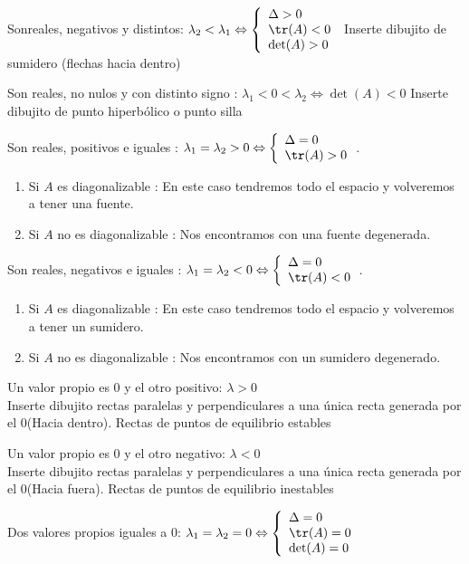 \begin{nlist}
  
\item Sonreales, negativos y distintos: $\lambda_2 < \lambda_1 \Leftrightarrow \left\{ \begin{array}{ll}\Delta > 0 \\ \tr(A) < 0 \\ \det(A)>0\end{array}\right.$
Inserte dibujito de sumidero (flechas hacia dentro)
\item Son reales, no nulos y con distinto signo : $\lambda_1 < 0 < \lambda_2 \Leftrightarrow \det(A)<0$
Inserte dibujito de punto hiperbólico o punto silla
\item Son reales, positivos e iguales : $\lambda_1=\lambda_2>0 \Leftrightarrow \left\{ \begin{array}{ll} \Delta = 0 \\ \tr(A)>0\end{array}\right.$.
  
\begin{enumerate}
\item Si $A$ es diagonalizable : En este caso tendremos todo el espacio y volveremos a tener una fuente.
\item Si $A$ no es diagonalizable : Nos encontramos con una fuente degenerada.
\end{enumerate}

\item Son reales, negativos e iguales : $\lambda_1=\lambda_2<0 \Leftrightarrow \left\{ \begin{array}{ll} \Delta = 0 \\ \tr(A)<0\end{array}\right.$.
  
\begin{enumerate}
\item Si $A$ es diagonalizable : En este caso tendremos todo el espacio y volveremos a tener un sumidero.
\item Si $A$ no es diagonalizable : Nos encontramos con un sumidero degenerado.
\end{enumerate}

\item Un valor propio es 0 y el otro positivo: $\lambda>0$ \\
Inserte dibujito rectas paralelas y perpendiculares a una única recta generada por el 0(Hacia dentro). Rectas  de puntos de equilibrio estables
\item Un valor propio es 0 y el otro negativo: $\lambda<0 $ \\
Inserte dibujito rectas paralelas y perpendiculares a una única recta generada por el 0(Hacia fuera). Rectas  de puntos de equilibrio inestables
\item Dos valores propios iguales a 0: $\lambda_1=\lambda_2=0 \Leftrightarrow \left\{ \begin{array}{ll}\Delta=0 \\ \tr(A)=0 \\ \det(A)=0\end{array}\right.$
  

\end{nlist}
